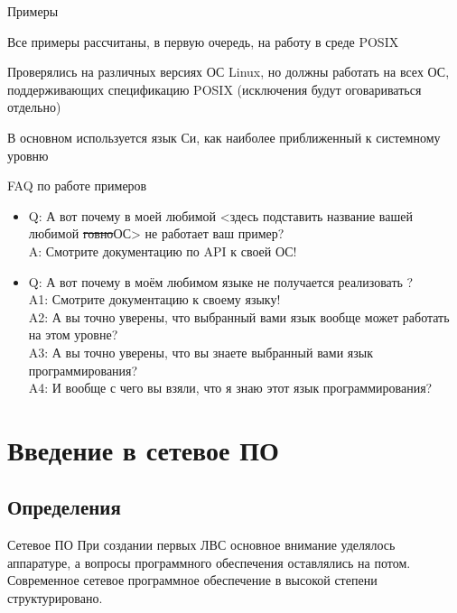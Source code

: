 \begin{frame}{Примеры}
\begin{center}
	Все примеры рассчитаны, в первую очередь, на работу в среде POSIX
\par
	Проверялись на различных версиях ОС Linux, но должны работать на всех ОС, поддерживающих спецификацию POSIX (исключения будут оговариваться отдельно)
\par	
	В основном используется язык Си, как наиболее приближенный к системному уровню
\end{center}
\end{frame}

\begin{frame}{FAQ по работе примеров}
	\begin{itemize}
		\item Q: А вот почему в моей любимой {\footnotesize <здесь подставить название вашей любимой \sout{говно}ОС>} не работает ваш пример?\\
	A: Смотрите документацию по API к своей ОС!
		\item Q: А вот почему в моём любимом языке {\footnotesize <здесь подставить название вашего любимого языка>} не получается реализовать {\footnotesize <здесь подставить название фичи, которую не получается использовать>}?\\
	A1: Смотрите документацию к своему языку!\\
	A2: А вы точно уверены, что выбранный вами язык вообще может работать на этом уровне?\\
	A3: А вы точно уверены, что вы знаете выбранный вами язык программирования?\\
	A4: И вообще с чего вы взяли, что я знаю этот язык программирования?
	\end{itemize}
\end{frame}

\section{Введение в сетевое ПО}
\subsection{Определения}

\begin{frame}{Сетевое ПО}
	При создании первых ЛВС основное внимание уделялось аппаратуре,  а вопросы программного обеспечения оставлялись на потом.
	Современное сетевое программное обеспечение в высокой степени структурировано.
\end{frame}

